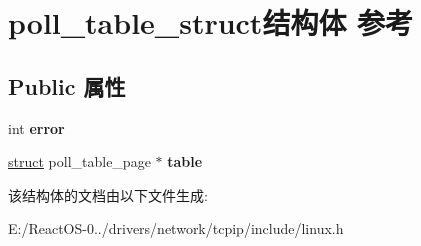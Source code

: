 \hypertarget{structpoll__table__struct}{}\section{poll\+\_\+table\+\_\+struct结构体 参考}
\label{structpoll__table__struct}
\subsection*{Public 属性}
\begin{DoxyCompactItemize}
\item 
\mbox{\label{structpoll__table__struct_a9673151f87fe05a792c6c04d3c786a84}} 
int {\bfseries error}
\item 
\mbox{\label{structpoll__table__struct_acfb93d1773571b54c17882983a7442f1}} 
\hyperlink{interfacestruct}{struct} poll\+\_\+table\+\_\+page $\ast$ {\bfseries table}
\end{DoxyCompactItemize}


该结构体的文档由以下文件生成\+:\begin{DoxyCompactItemize}
\item 
E\+:/\+React\+O\+S-\/0../drivers/network/tcpip/include/linux.\+h\end{DoxyCompactItemize}
